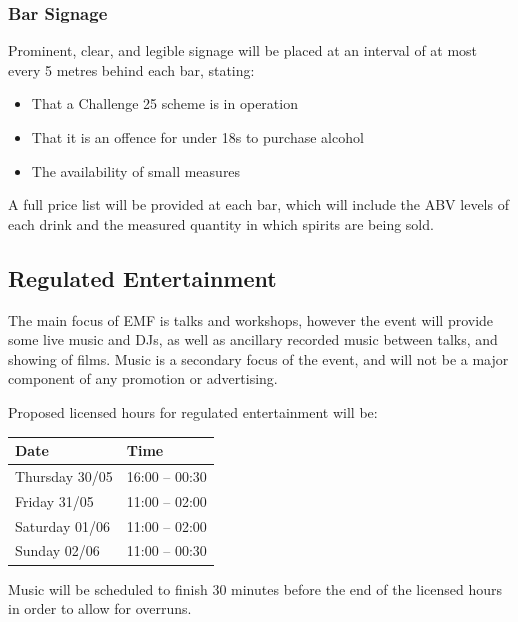 \subsubsection{Bar Signage}

Prominent, clear, and legible signage will be placed at an interval of at most
every 5 metres behind each bar, stating:

\begin{itemize}
    \tightlist
    \item That a Challenge 25 scheme is in operation
    \item That it is an offence for under 18s to purchase alcohol
    \item The availability of small measures
\end{itemize}

A full price list will be provided at each bar, which will include the ABV levels
of each drink and the measured quantity in which spirits are being sold.

\subsection{Regulated Entertainment}

The main focus of EMF is talks and workshops, however the event will provide
some live music and DJs, as well as ancillary recorded music between talks, and
showing of films. Music is a secondary focus of the event, and will not be a major
component of any promotion or advertising.

Proposed licensed hours for regulated entertainment will be:

\begin{table}[h!]
    \centering
    \begin{tabular}{| l l |}
        \hline
        \textbf{Date}  & \textbf{Time}  \\
        \hline
        Thursday 30/05 & 16:00 -- 00:30 \\
        Friday 31/05   & 11:00 -- 02:00 \\
        Saturday 01/06 & 11:00 -- 02:00 \\
        Sunday 02/06   & 11:00 -- 00:30 \\
        \hline
    \end{tabular}
\end{table}

Music will be scheduled to finish 30 minutes before the end of the licensed hours in
order to allow for overruns.

